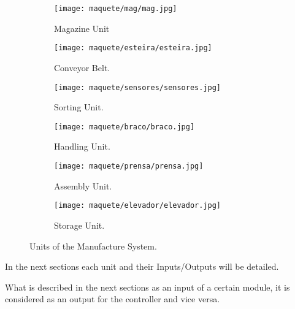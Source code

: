 \begin{figure}[H]
\begin{subfigure}[t]{0.35\textwidth}
  \centering
  \texttt{[image: maquete/mag/mag.jpg]}
  \caption{Magazine Unit}
\end{subfigure}
\hfill
\begin{subfigure}[t]{0.35\textwidth}
  \centering
  \texttt{[image: maquete/esteira/esteira.jpg]}
  \caption{Conveyor Belt.}
\end{subfigure}

\begin{subfigure}[t]{0.35\textwidth}
  \centering
  \texttt{[image: maquete/sensores/sensores.jpg]}
  \caption{Sorting Unit.}
\end{subfigure}
\hfill
\begin{subfigure}[t]{0.35\textwidth}
  \centering
  \texttt{[image: maquete/braco/braco.jpg]}
  \caption{Handling Unit.}
\end{subfigure}

\begin{subfigure}[t]{0.35\textwidth}
  \centering
  \texttt{[image: maquete/prensa/prensa.jpg]}
  \caption{Assembly Unit.}
\end{subfigure}
\hfill
\begin{subfigure}[t]{0.35\textwidth}
  \centering
  \texttt{[image: maquete/elevador/elevador.jpg]}
  \caption{Storage Unit.}
\end{subfigure}
  \caption{Units of the Manufacture System.}
  \label{fig:units}
\end{figure}

In the next sections each unit and their Inputs\slash Outputs will be detailed.

\begin{observation}
What is described in the next sections as an input of a certain module, it is
considered as an output for the controller and vice versa.  
\end{observation}

